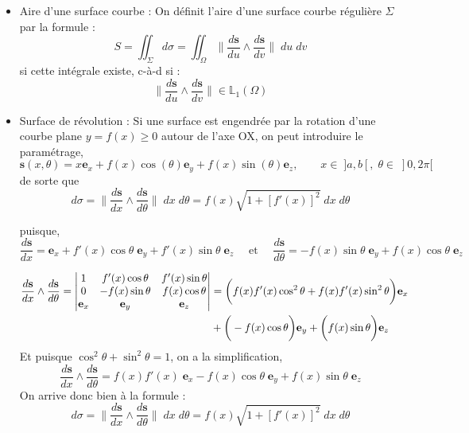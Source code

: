 \documentclass[a4paper]{article}
\begin{document}
\begin{itemize}
\item Aire d'une surface courbe : On définit l'aire d'une surface courbe régulière $ \Sigma $ par la formule : 
\[ S = \iint_\Sigma d \sigma = \iint_\Omega \bigg\| \frac{d \textbf{s}}{d u} \wedge \frac{d \textbf{s}}{d v} \bigg\| \; d u \; d v \]
si cette intégrale existe, c-à-d si : 
\[  \bigg\| \frac{d \textbf{s}}{d u} \wedge \frac{d \textbf{s}}{d v} \bigg\| \in \mathbb{L}_1(\Omega) \]






\item Surface de révolution : Si une surface est engendrée par la rotation d'une courbe plane $ y = f(x) \geq 0 $ autour de l'axe OX, on peut introduire le paramétrage, 
\[ \textbf{s}(x, \theta) = x \textbf{e}_x + f(x) \cos(\theta) \textbf{e}_y + f(x) \sin(\theta) \textbf{e}_z, \qquad x \in \; ]a, b[, \; \theta \in \; ]0, 2 \pi[ \]
de sorte que 
\[ d \sigma = \bigg\| \frac{d \textbf{s}}{d x} \wedge \frac{d \textbf{s}}{d \theta} \bigg\| \; d x \; d \theta = f(x) \sqrt{ 1 + [f'(x)]^2 } \; d x \; d \theta \]



\begin{siderules}

puisque, 
\[ \frac{d \textbf{s}}{d x} = \textbf{e}_x + f'(x) \cos \theta \;  \textbf{e}_y + f'(x) \sin \theta \; \textbf{e}_z
\quad \text{ et } \quad \frac{d \textbf{s}}{d \theta} = - f(x) \sin \theta \; \textbf{e}_y + f(x) \cos \theta \; \textbf{e}_z \]

\begin{align*}
\frac{d \textbf{s}}{d x} \wedge \frac{d \textbf{s}}{d \theta} = 
\begin{vmatrix}
1 & f'(x) \cos \theta & f'(x) \sin \theta \cr
0 & - f(x) \sin \theta & f(x) \cos \theta \cr
\textbf{e}_x & \textbf{e}_y & \textbf{e}_z \cr
\end{vmatrix}
&= \bigg( f(x) f'(x) \cos^2 \theta + f(x) f'(x) \sin^2 \theta \bigg) \textbf{e}_x \cr
&+ \bigg( - f(x) \cos \theta \bigg) \textbf{e}_y
+ \bigg( f(x) \sin \theta \bigg) \textbf{e}_z \cr
\end{align*}
Et puisque $ \cos^2\theta + \sin^2\theta = 1 $, on a la simplification, 
\[ \frac{d \textbf{s}}{d x} \wedge \frac{d \textbf{s}}{d \theta} = f(x) f'(x) \; \textbf{e}_x - f(x) \cos \theta \; \textbf{e}_y + f(x) \sin \theta \; \textbf{e}_z \]
On arrive donc bien à la formule : 
\[ d \sigma = \bigg\| \frac{d \textbf{s}}{d x} \wedge \frac{d \textbf{s}}{d \theta} \bigg\| \; d x \; d \theta = f(x) \sqrt{ 1 + [f'(x)]^2 } \; d x \; d \theta \]


\end{siderules}
\end{itemize}
\end{document}
